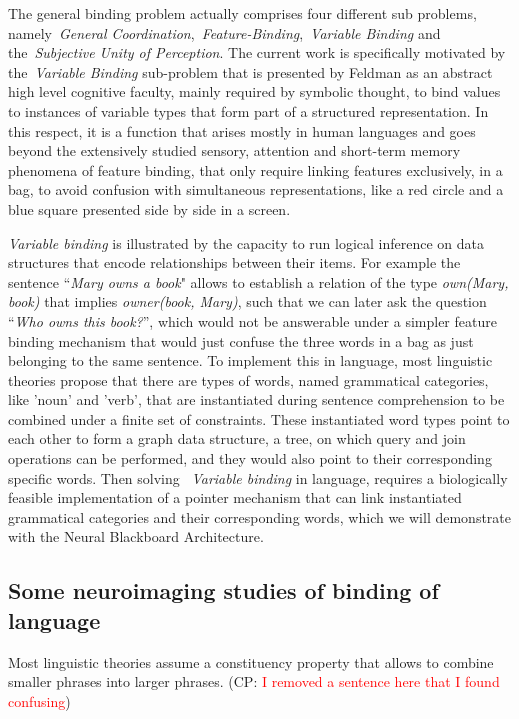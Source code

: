 \documentclass[10pt]{article}
\newcommand{\noteCP}[1]{(CP: \textcolor{red}{#1})}
\begin{document}
The general binding problem actually comprises four different sub problems, namely~\emph{General Coordination},~\emph{Feature-Binding},~\emph{Variable Binding} and the~\emph{Subjective Unity of Perception}\cite{Feldman_2012}.
The current work is specifically motivated by the~\emph{Variable Binding} sub-problem that is presented by Feldman as an abstract high level cognitive faculty, mainly required by symbolic thought, to bind values to instances of variable types that form part of a structured representation.
In this respect, it is a function that arises mostly in human languages and goes beyond the extensively studied sensory, attention and short-term memory phenomena of feature binding, that only require linking features exclusively, in a bag, to avoid confusion with simultaneous representations, like a red circle and a blue square presented side by side in a screen.

\emph{Variable binding} is illustrated by the capacity to run logical inference on data structures that encode relationships between their items.
For example the sentence ``\emph{Mary owns a book}" allows to establish a relation of the type \emph{own(Mary, book)} that implies \emph{owner(book, Mary)}, such that we can later ask the question ``\emph{Who owns this book?}'', which would not be answerable under a simpler feature binding mechanism that would just confuse the three words in a bag as just belonging to the same sentence.
To implement this in language, most linguistic theories propose that there are types of words, named grammatical categories, like 'noun' and 'verb', that are instantiated during sentence comprehension to be combined under a finite set of constraints.
These instantiated word types point to each other to form a graph data structure, a tree, on which query and join operations can be performed, and they would also point to their corresponding specific words.
Then solving ~\emph{Variable binding} in language, requires a biologically feasible implementation of a pointer mechanism that can link instantiated grammatical categories and their corresponding words, which we will demonstrate with the Neural Blackboard Architecture.


\subsection{Some neuroimaging studies of binding of language}

{\label{729344}}

Most linguistic theories assume a constituency property that allows to combine smaller phrases into larger phrases.
\noteCP{I removed a sentence here that I found confusing}
\end{document}
